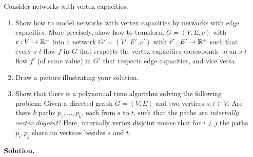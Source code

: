 \documentclass[12pt,a4]{article}
\begin{document}
\begin{exercise} Consider networks with vertex capacities.
  \begin{enumerate}
    \item Show how to model networks with vertex capacities by 
      networks with edge capacities. More precisely, 
      show how to transform $G = (V,E,c)$ with $c: V \rightarrow \mathbb{R}^+$
      into a network $G' = (V',E',c')$ with $c': E' \rightarrow \mathbb{R}^+$
      such that every $s$-$t$-flow $f$ in $G$ that respects the vertex capacities 
      corresponds to an $s$-$t$-flow $f'$ (of same value) in $G'$ that
      respects edge capacities, and vice versa.
    \item Draw a picture illustrating your solution.
    \item Show that there is a polynomial time algorithm solving the
      following problem: Given a directed graph $G = (V,E)$ and two
      vertices $s,t \in V$.  Are there $k$ paths $p_1,\dots,p_k$, each
      from $s$ to $t$, such that the paths are {\em internally vertex
        disjoint}?  Here, internally vertex disjoint means that for $i
      \ne j$ the paths $p_i,p_j$ share no vertices besides $s$ and
      $t$.
  \end{enumerate}
\end{exercise}
\textbf{Solution.}
\end{document}
